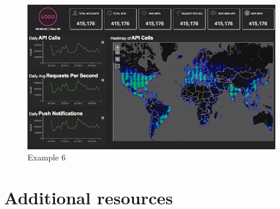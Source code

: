 \documentclass[]{report}
\begin{document}
\begin{figure}[ht]
    \includegraphics[width =\columnwidth]{dashboard_example6.png}
    \caption{Example 6}
    \label{fig:EX6}
\end{figure}

\chapter{Additional resources}
\end{document}

